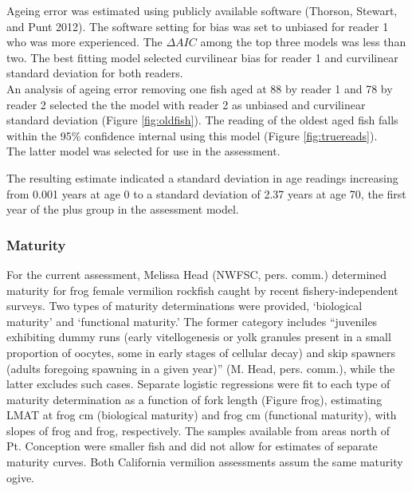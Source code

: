 \documentclass[11pt,
  english,
  a4paper,
]{article}
\begin{document}
Ageing error was estimated using publicly available software {(Thorson, Stewart, and Punt 2012)\leavevmode\tagmcend\tagstructend}. The software setting for bias was set to unbiased for reader 1 who was more experienced. The {\(\Delta AIC\)\leavevmode\tagmcend\tagstructend} among the top three models was less than two. The best fitting model selected curvilinear bias for reader 1 and curvilinear standard deviation for both readers.\\
An analysis of ageing error removing one fish aged at 88 by reader 1 and 78 by reader 2 selected the the model with reader 2 as unbiased and curvilinear standard deviation (Figure \ref{fig:oldfish}). The reading of the oldest aged fish falls within the 95\% confidence internal using this model (Figure \ref{fig:truereads}).\\
The latter model was selected for use in the assessment.

The resulting estimate indicated a standard deviation in age readings increasing from 0.001 years at age 0 to a standard deviation of 2.37 years at age 70, the first year of the plus group in the assessment model.


\hypertarget{maturity}{%
\subsubsection{Maturity}\label{maturity}}

\leavevmode\tagmcend\tagstructend

For the current assessment, Melissa Head (NWFSC, pers. comm.) determined maturity for frog female vermilion rockfish caught by recent fishery-independent surveys. Two types of maturity determinations were provided, `biological maturity' and `functional maturity.' The former category includes ``juveniles exhibiting dummy runs (early vitellogenesis or yolk granules present in a small proportion of oocytes, some in early stages of cellular decay) and skip spawners (adults foregoing spawning in a given year)'' (M. Head, pers. comm.), while the latter excludes such cases. Separate logistic regressions were fit to each type of maturity determination as a function of fork length (Figure frog), estimating LMAT at frog cm (biological maturity) and frog cm (functional maturity), with slopes of frog and frog, respectively. The samples available from areas north of Pt. Conception were smaller fish and did not allow for estimates of separate maturity curves. Both California vermilion assessments assum the same maturity ogive.
\end{document}
